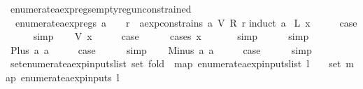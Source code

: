 \begin{isabellebody}
\ enumerate{\isacharunderscore}aexp{\isacharunderscore}regs{\isacharunderscore}empty{\isacharunderscore}reg{\isacharunderscore}unconstrained{\isacharcolon}\isanewline
\ \ {\isachardoublequoteopen}enumerate{\isacharunderscore}aexp{\isacharunderscore}regs\ a\ {\isacharequal}\ {\isacharbraceleft}{\isacharbraceright}\ {\isasymLongrightarrow}\ {\isasymforall}r{\isachardot}\ {\isasymnot}\ aexp{\isacharunderscore}constrains\ a\ {\isacharparenleft}V\ {\isacharparenleft}R\ r{\isacharparenright}{\isacharparenright}{\isachardoublequoteclose}\isanewline
%
\isadelimproof
%
\endisadelimproof
%
\isatagproof
{}\isamarkupfalse%
{\isacharparenleft}induct\ a{\isacharparenright}\isanewline
{}\isamarkupfalse%
\ {\isacharparenleft}L\ x{\isacharparenright}\isanewline
\ \ \isamarkupfalse%
\ \isamarkupfalse%
\ {\isacharquery}case\isanewline
\ \ \ \ \isamarkupfalse%
\ simp\isanewline
{}\isamarkupfalse%
\isanewline
\ \ \isamarkupfalse%
\ {\isacharparenleft}V\ x{\isacharparenright}\isanewline
\ \ \isamarkupfalse%
\ \isamarkupfalse%
\ {\isacharquery}case\isanewline
\ \ \ \ \isamarkupfalse%
\ {\isacharparenleft}cases\ x{\isacharparenright}\isanewline
\ \ \ \ \ \isamarkupfalse%
\ simp\isanewline
\ \ \ \ \isamarkupfalse%
\ simp\isanewline
{}\isamarkupfalse%
\isanewline
\ \ \isamarkupfalse%
\ {\isacharparenleft}Plus\ a{}\ a{}{\isacharparenright}\isanewline
\ \ \isamarkupfalse%
\ \isamarkupfalse%
\ {\isacharquery}case\isanewline
\ \ \ \ \isamarkupfalse%
\ simp\isanewline
{}\isamarkupfalse%
\isanewline
\ \ \isamarkupfalse%
\ {\isacharparenleft}Minus\ a{}\ a{}{\isacharparenright}\isanewline
\ \ \isamarkupfalse%
\ \isamarkupfalse%
\ {\isacharquery}case\isanewline
\ \ \ \ \isamarkupfalse%
\ simp\isanewline
{}\isamarkupfalse%
%
\endisatagproof
{\isafoldproof}%
%
\isadelimproof
\isanewline
%
\endisadelimproof
\isanewline
{}\isamarkupfalse%
\ set{\isacharunderscore}enumerate{\isacharunderscore}aexp{\isacharunderscore}inputs{\isacharunderscore}list{\isacharcolon}\ {\isachardoublequoteopen}set\ {\isacharparenleft}fold\ {\isacharparenleft}{\isacharat}{\isacharparenright}\ {\isacharparenleft}map\ enumerate{\isacharunderscore}aexp{\isacharunderscore}inputs{\isacharunderscore}list\ l{\isacharparenright}\ {\isacharbrackleft}{\isacharbrackright}{\isacharparenright}\ {\isacharequal}\ {\isacharparenleft}{\isasymUnion}\ set\ {\isacharparenleft}map\ enumerate{\isacharunderscore}aexp{\isacharunderscore}inputs\ l{\isacharparenright}{\isacharparenright}{\isachardoublequoteclose}\isanewline

\end{isabellebody}
